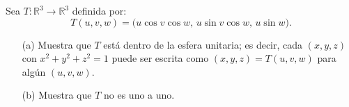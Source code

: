 Sea \( T : \mathbb{R}^3 \to \mathbb{R}^3 \) definida por:
\[
T(u, v, w) = \big(u \cos v \cos w, \, u \sin v \cos w, \, u \sin w\big).
\]

\begin{enumerate}
    \item[(a)] Muestra que \( T \) está dentro de la esfera unitaria; es decir, cada \( (x, y, z) \) con \( x^2 + y^2 + z^2 = 1 \) puede ser escrita como \( (x, y, z) = T(u, v, w) \) para algún \( (u, v, w) \).
    \item[(b)] Muestra que \( T \) no es uno a uno.
\end{enumerate}